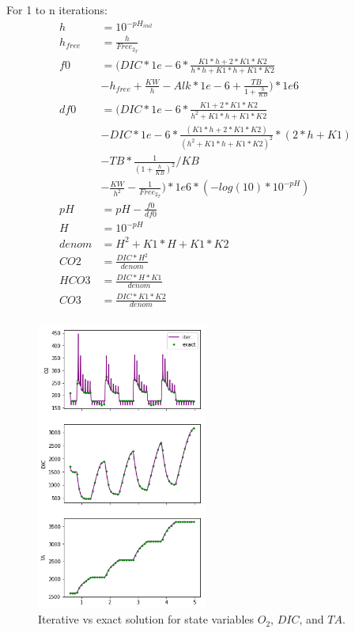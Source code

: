 \documentclass{ruthesis}
\begin{document}
For 1 to n iterations:
\begin{align*}
h 			&=  10^{-pH_{init}}	\nonumber \\
h_{free} 	&=  \frac{h}{Free_{2_T}}	 \nonumber \\
f0 			&= (  DIC*1e-6*\frac{K1*h+2*K1*K2}{h*h+K1*h+K1*K2}    \nonumber\\
			&  - h_{free} + \frac{KW}{h} - Alk*1e-6 + \frac{TB}{1+\frac{h}{KB}} )*1e6 \nonumber  \\
df0 		&= (  DIC*1e-6*\frac{K1 +2*K1*K2}{h^2+K1*h+K1*K2}  \nonumber\\
			&  -DIC*1e-6*\frac{(K1*h+2*K1*K2)}{(h^2+K1*h+K1*K2)^2}*(2*h+K1)  \nonumber\\
			&  -TB *\frac{1}{(1+ \frac{h}{KB})^2} / KB   \nonumber \\
			&  -\frac{KW}{h^2} - \frac{1}{Free_{2_T}} )*1e6  * (-log(10)*10^{-pH}) \nonumber \\
pH 			&= pH - \frac{f0}{df0} \nonumber \\
H 			&= 10^{-pH} \nonumber \\
denom 		&= H^2+K1*H+K1*K2 \nonumber  \\
CO2  		&= \frac{DIC*H^2}{denom} \nonumber \\
HCO3 		&= \frac{DIC*H *K1}{denom} \nonumber \\
CO3  		&= \frac{DIC*K1*K2}{denom}      \nonumber \\                         
\end{align*}




\begin{figure}
	\centerline{\includegraphics[width=0.5\textwidth]{images_microalgae/plots/iterative_states}}
	\caption[.]{Iterative vs exact solution for state variables $O_2$, $DIC$, and $TA$.}
	\label{fig:iterative_states}
\end{figure}
\end{document}
